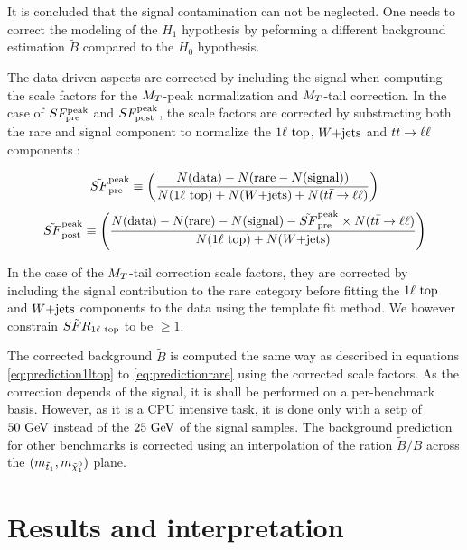         It is concluded that the signal contamination can not be neglected. One needs to correct the modeling
        of the $H_1$ hypothesis by peforming a different background estimation $\tilde{B}$ compared to the 
        $H_0$ hypothesis.

        The data-driven aspects are corrected by including the signal when computing the scale factors for the
        $M_T$-peak normalization and $M_T$-tail correction. In the case of $SF_{\text{pre}}^{\text{peak}}$ and $SF_{\text{post}}^{\text{peak}}$, the scale factors
        are corrected by substracting both the rare and signal component to normalize the $1\ell~\text{top}$, $\text{$W$+jets}$
        and $t\bar{t} \rightarrow \ell \ell$ components :

        \begin{equation}
            \tilde{SF}_{\text{pre}}^{\text{peak}} \equiv \left( \frac{N(\text{data}) - N(\text{rare} - N(\text{signal}))}{N(1\ell~\text{top}) + N(\text{$W$+jets}) + N(t\bar{t} \rightarrow \ell \ell)} \right)
        \end{equation}
        \begin{equation}
            \tilde{SF}_{\text{post}}^{\text{peak}} \equiv \left( \frac{N(\text{data}) - N(\text{rare}) - N(\text{signal}) - \tilde{SF}_{\text{pre}}^{\text{peak}} \times N(t\bar{t} \rightarrow \ell \ell)}{N(1\ell~\text{top}) + N(\text{$W$+jets})} \right)
        \end{equation}

        In the case of the $M_T$-tail correction scale factors, they are corrected by including the signal contribution
        to the rare category before fitting the $1\ell~\text{top}$ and $\text{$W$+jets}$ components to the data using the template
        fit method. We however constrain $\tilde{SFR}_{1\ell~\text{top}}$ to be $\geq 1$.

        The corrected background $\tilde{B}$ is computed the same way as described in equations \ref{eq:prediction1ltop} to \ref{eq:predictionrare}
        using the corrected scale factors. As the correction depends of the signal, it is shall be performed on a per-benchmark
        basis. However, as it is a CPU intensive task, it is done only with a setp of $50 ~\text{GeV}$ instead of the $25 ~\text{GeV}$
        of the signal samples. The background prediction for other benchmarks is corrected using an interpolation of
        the ration $\tilde{B}/B$ across the $(m_{\tilde{t}_1},m_{\tilde{\chi}_1^0})$ plane.

    \section{Results and interpretation \label{sec:analysis_results}}

